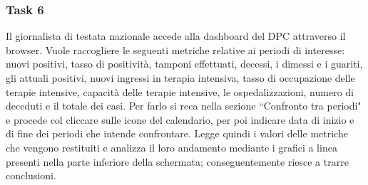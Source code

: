 \subsubsection{Task 6}
\label{sss:cw-task-6}

Il giornalista di testata nazionale accede alla dashboard del DPC attraverso il browser.
Vuole raccogliere le seguenti metriche relative ai periodi di interesse: nuovi positivi, tasso di positività, tamponi effettuati, decessi, i dimessi e i guariti, gli attuali positivi, nuovi ingressi in terapia intensiva, tasso di occupazione delle terapie intensive, capacità delle terapie intensive, le ospedalizzazioni,  numero di deceduti e il totale dei casi.
Per farlo si reca nella sezione ``Confronto tra periodi" e procede col cliccare sulle icone del calendario, per poi indicare data di inizio e di fine dei periodi che intende confrontare.
Legge quindi i valori delle metriche che vengono restituiti e analizza il loro andamento mediante i grafici a linea presenti nella parte inferiore della schermata; conseguentemente riesce a trarre conclusioni. 